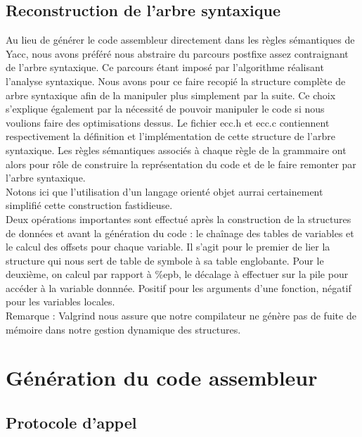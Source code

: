\documentclass[a4paper, 11pt]{article}
\begin{document}
\subsection{Reconstruction de l'arbre syntaxique}

Au lieu de générer le code assembleur directement dans les règles sémantiques de Yacc, nous avons préféré nous abstraire du parcours 
postfixe assez contraignant de l'arbre syntaxique. Ce parcours étant imposé par l'algorithme réalisant l'analyse syntaxique. Nous avons
pour ce faire recopié la structure complète de arbre syntaxique afin de la manipuler plus simplement par la suite. Ce choix s'explique 
également par la nécessité de pouvoir manipuler le code si nous voulions faire des optimisations dessus.
Le fichier ecc.h et ecc.c contiennent respectivement la définition et l'implémentation de cette structure de l'arbre syntaxique.
Les règles sémantiques associés à chaque règle de la grammaire ont alors pour rôle de construire la représentation du code et de le faire
remonter par l'arbre syntaxique.\\

Notons ici que l'utilisation d'un langage orienté objet aurrai certainement simplifié cette construction fastidieuse.\\

Deux opérations importantes sont effectué après la construction de la structures de données et avant la génération du code : 
le cha\^inage des tables de variables et le calcul des offsets pour chaque variable.
Il s'agit pour le premier de lier la structure qui nous sert de table de symbole à sa table englobante.
Pour le deuxième, on calcul par rapport à \%epb, le décalage à effectuer sur la pile pour accéder à la variable donnnée. Positif 
pour les arguments d'une fonction, négatif pour les variables locales.\\

Remarque : Valgrind nous assure que notre compilateur ne génère pas de fuite de mémoire dans notre gestion dynamique des structures.

\section{Génération du code assembleur}

\subsection{Protocole d'appel}
\end{document}
